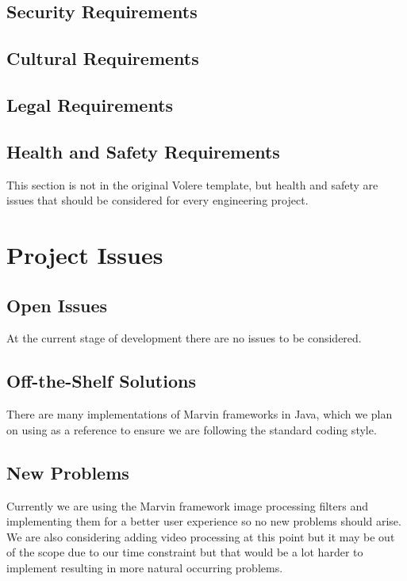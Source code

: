 \documentclass[12pt, titlepage]{article}
\begin{document}
\subsection{Security Requirements}

\subsection{Cultural Requirements}

\subsection{Legal Requirements}

\subsection{Health and Safety Requirements}

This section is not in the original Volere template, but health and safety are
issues that should be considered for every engineering project.

\section{Project Issues}

\subsection{Open Issues}
At the current stage of development there are no issues to be considered.

\subsection{Off-the-Shelf Solutions}

There are many implementations of Marvin frameworks in Java, which we plan on using as a reference to ensure we are following the standard coding style.

\subsection{New Problems}

Currently we are using the Marvin framework image processing filters and implementing them for a better user experience so no new problems should arise. We are also considering adding video processing at this point but it may be out of the scope due to our time constraint but that would be a lot harder to implement resulting in more natural occurring problems.
\end{document}
